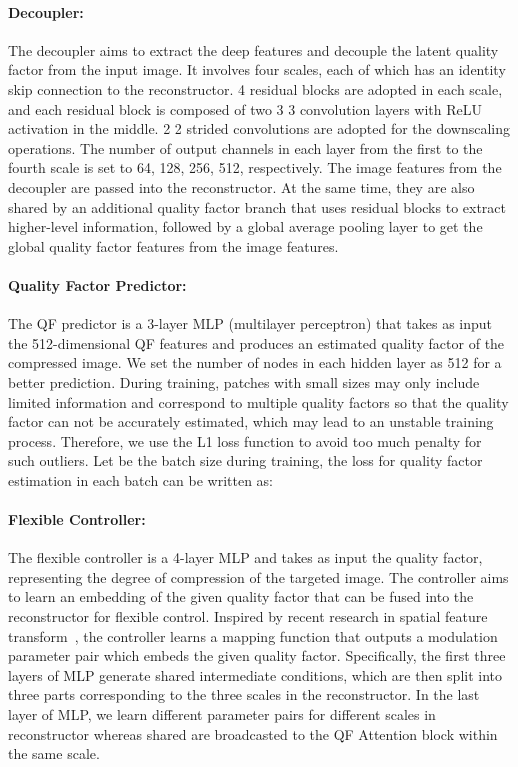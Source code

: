 \documentclass[10pt,twocolumn,letterpaper]{article}
\begin{document}
\paragraph{Decoupler:} The decoupler aims to extract the deep features and decouple the latent quality factor from the input image. It involves four scales, each of which has an identity skip connection to the reconstructor. 4 residual blocks are adopted in each scale, and each residual block is composed of two 3  3 convolution layers with ReLU activation in the middle. 2  2 strided convolutions are adopted for the downscaling operations. The number of output channels in each layer from the first to the fourth scale is set to 64, 128, 256, 512, respectively. The image features from the decoupler are passed into the reconstructor. At the same time, they are also shared by an additional quality factor branch that uses residual blocks to extract higher-level information, followed by a global average pooling layer to get the global quality factor features from the image features. 


\paragraph{Quality Factor Predictor:} The QF predictor is a 3-layer MLP (multilayer perceptron) that takes as input the 512-dimensional QF features and produces an estimated quality factor  of the compressed image. We set the number of nodes in each hidden layer as 512 for a better prediction. During training, patches with small sizes may only include limited information and correspond to multiple quality factors so that the quality factor can not be accurately estimated, which may lead to an unstable training process. Therefore, we use the L1 loss function to avoid too much penalty for such outliers. Let  be the batch size during training, the loss for quality factor estimation in each batch can be written as:



\paragraph{Flexible Controller:} The flexible controller is a 4-layer MLP and takes as input the quality factor, representing the degree of compression of the targeted image. The controller aims to learn an embedding of the given quality factor that can be fused into the reconstructor for flexible control. Inspired by recent research in spatial feature transform~\cite{park2019semantic, wang2018recovering}, the controller learns a mapping function that outputs a modulation parameter pair  which embeds the given quality factor. Specifically, the first three layers of MLP generate shared intermediate conditions, which are then split into three parts corresponding to the three scales in the reconstructor. In the last layer of MLP, we learn different parameter pairs for different scales in reconstructor whereas shared  are broadcasted to the QF Attention block within the same scale.
\end{document}
